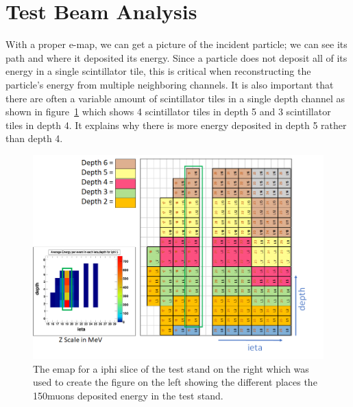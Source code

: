 \section{Test Beam Analysis}

With a proper e-map, we can get a picture of the incident particle; we can see its path and where it deposited its energy. Since a particle does not deposit all of its energy in a single scintillator tile, this is critical when reconstructing the particle's energy from multiple neighboring channels. It is also important that there are often a variable amount of scintillator tiles in a single depth channel as shown in figure~\ref{fig:emap} which shows 4 scintillator tiles in depth 5 and 3 scintillator tiles in depth 4. It explains why there is more energy deposited in depth 5 rather than depth 4. 

\begin{figure}
\centering
\includegraphics[width=\linewidth]{Figures/eplot.png}
\caption{The emap for a iphi slice of the test stand on the right which was used to create the figure on the left showing the different places the 150\GeV\space muons deposited energy in the test stand.}
\label{fig:emap}
\end{figure}


